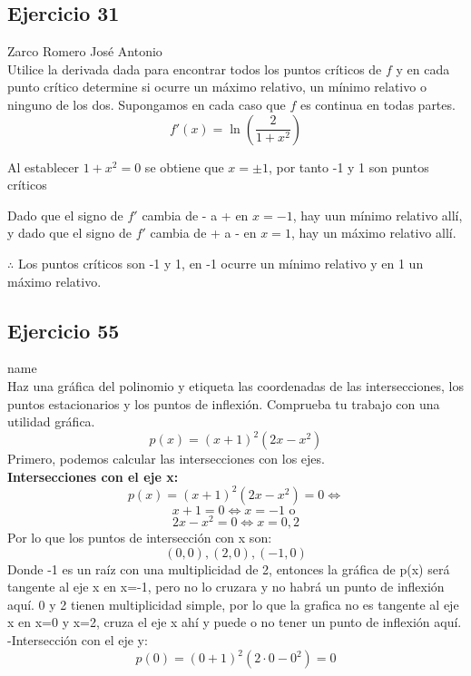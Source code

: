 \documentclass[12pt]{article}
\begin{document}
\subsection{Ejercicio 31} Zarco Romero José Antonio \\

Utilice la derivada dada para encontrar todos los puntos críticos de $f$ y en cada punto crítico determine si ocurre un máximo relativo, un mínimo relativo o ninguno de los dos. Supongamos en cada caso que $f$ es continua en todas partes.
\[
f'(x)=\ln{\left( \frac{2}{1+x^2} \right)}
\]

Al establecer $1+x^2=0$ se obtiene que $x=\pm 1$, por tanto -1 y 1 son puntos críticos
  \begin{table}[H]
    \centering
    \begin{tabular}{c|c|c}
      \hline
      Intervalo & $f'(x) = \ln{\left( \frac{2}{1+x^2} \right)$ & Conclusión \\
      \hline
      $(-\infty,-1)$ & - & $f$ es decreciente \\
      $(-1,1)$ & + & $f$ es creciente\\
      $(1,+\infty)$ & - & $f$ es decreciente\\
      \hline
    \end{tabular}
  \end{table}
  Dado que el signo de $f'$ cambia de - a + en $x=-1$, hay uun mínimo relativo allí, y
  dado que el signo de $f'$ cambia de + a - en $x=1$, hay un máximo relativo allí.

  $\therefore $ Los puntos críticos son -1 y 1, en -1 ocurre un mínimo relativo y en 1 un máximo relativo.

\subsection{Ejercicio 55} name \\

Haz una gráfica del polinomio y etiqueta las coordenadas de las intersecciones, los puntos estacionarios y los puntos de inflexión. Comprueba tu trabajo con una utilidad gráfica.
\[
p(x) = (x + 1)^2 (2x-x^2 )
\]
Primero, podemos calcular las intersecciones con los ejes. \\
\textbf {Intersecciones con el eje x:}
\[
p(x) = (x + 1)^2 (2x-x^2 ) = 0 \iff 
\]
\[
x+1 = 0 \iff  x = -1 \text{ o } 
 \]
 \[
 2x-x^{2}=0 \iff x = 0, 2
 \]
 Por lo que los puntos de intersección con x son:
 \[
(0,0), (2,0), (-1, 0)
 \]
 Donde -1 es un raíz con una multiplicidad de 2, entonces la gráfica de p(x) será tangente al eje x en x=-1, pero no lo cruzara y no habrá un punto de inflexión aquí. 0 y 2 tienen multiplicidad simple, por lo que la grafica no es tangente al eje x en x=0 y x=2, cruza el eje x ahí y puede o no tener un punto de inflexión aquí.\\
 -Intersección con el eje y:\\
 \[
 p(0) = (0 + 1)^2 (2\cdot0-0^2) = 0
 \]
 
\end{document}
